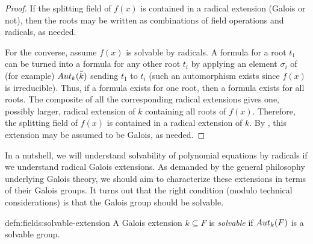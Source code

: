 \begin{proof}
  If the splitting field of $f(x)$ is contained in a radical extension
  (Galois or not), then the roots may be written as combinations of
  field operations and radicals, as needed.

  For the converse, assume $f(x)$ is solvable by radicals. A formula
  for a root $t_1$ can be turned into a formula for any other root
  $t_i$ by applying an element $\sigma_i$ of (for example)
  $Aut_k(\bar{k})$ sending $t_1$ to $t_i$ (such an automorphism
  exists since $f(x)$ is irreducible). Thus, if a formula exists for
  one root, then a formula exists for all roots. The composite of all
  the corresponding radical extensions gives one, possibly larger,
  radical extension of $k$ containing all roots of $f(x)$. Therefore,
  the splitting field of $f(x)$ is contained in a radical extension of
  $k$. By , this extension may be assumed to be
  Galois, as needed.
\end{proof}
In a nutshell, we will understand solvability of polynomial equations
by radicals if we understand radical Galois extensions. As demanded by
the general philosophy underlying Galois theory, we should aim to
characterize these extensions in terms of their Galois groups. It
turns out that the right condition (modulo technical considerations)
is that the Galois group should be solvable.

\begin{defn}{}{defn:fields:solvable-extension}
  A Galois extension $k \subseteq F$ is \emph{solvable} if $Aut_k(F)$
  is a solvable group.
\end{defn}

